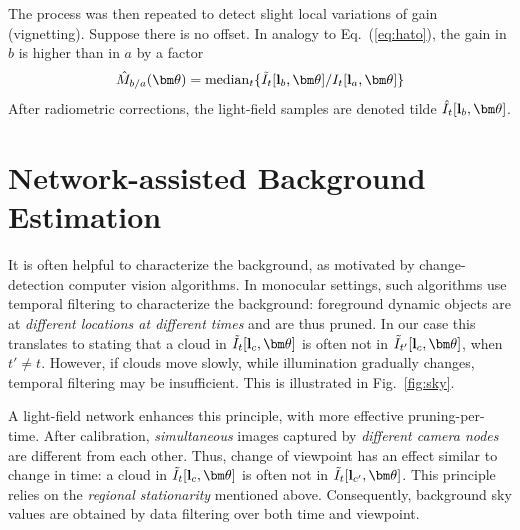 \documentclass[runningheads]{llncs}
\begin{document}
The process was then repeated to detect slight local variations of gain (vignetting). Suppose there is no offset. In analogy to Eq.~(\ref{eq:hato}), the gain in $b$ is higher than in $a$ by a factor
\begin{equation}
 {\hat M}_{b/a}({\bm \theta})=
  {\rm median}_{t} \{\tilde I_t[{\bf l}_b,{\bm \theta}]/I_t[{\bf l}_a,{\bm \theta}]\}
 \label{eq:hato}
\end{equation}
After radiometric corrections, the light-field samples are denoted tilde $\hat I_t[{\bf l}_b,{\bm \theta}]$.





\section{Network-assisted Background Estimation}
\label{sec:background}

It is often helpful to characterize the background, as motivated by change-detection computer vision algorithms. In monocular settings, such algorithms use temporal filtering to characterize the background: foreground dynamic objects are at {\em different locations at different times} and are thus pruned. In our case this translates to stating that a cloud in
$\tilde I_t[{\bf l}_c,{\bm \theta}]$ is often not in
$\tilde I_{t'}[{\bf l}_c,{\bm \theta}]$, when $t'\neq t$. However, if clouds move slowly, while illumination gradually changes, temporal filtering may be insufficient. This is illustrated in Fig.~\ref{fig:sky}.

A light-field network enhances this principle, with more effective pruning-per-time. After calibration, {\em simultaneous} images captured by {\em different camera nodes} are different from each other. Thus, change of viewpoint has an effect similar to change in time: a cloud in
$\tilde I_t[{\bf l}_c,{\bm \theta}]$ is often not in $\tilde I_t[{\bf l}_{c'},{\bm \theta}]$. This principle relies on the {\em regional stationarity} mentioned above. Consequently, background sky values are obtained by data filtering over both time and viewpoint.
\end{document}
